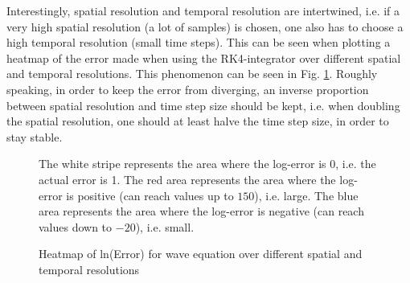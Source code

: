 Interestingly, spatial resolution and temporal resolution are intertwined, i.e. if a very high spatial resolution (a lot of samples) is chosen, one also has to choose a high temporal resolution (small time steps).
This can be seen when plotting a heatmap of the error made when using the RK4-integrator over different spatial and temporal resolutions.
This phenomenon can be seen in Fig. \ref{fig:heatmap_wave_eq_step_size_numgridpoints}.
Roughly speaking, in order to keep the error from diverging, an inverse proportion between spatial resolution and time step size should be kept, i.e. when doubling the spatial resolution, one should at least halve the time step size, in order to stay stable.

\begin{figure}[!h]
    \caption{Heatmap of ln(Error) for wave equation over different spatial and temporal resolutions}
    \label{fig:heatmap_wave_eq_step_size_numgridpoints}
	\small
The white stripe represents the area where the log-error is 0, i.e. the actual error is 1.
The red area represents the area where the log-error is positive (can reach values up to $150$), i.e. large.
The blue area represents the area where the log-error is negative (can reach values down to $-20$), i.e. small.
\end{figure}





